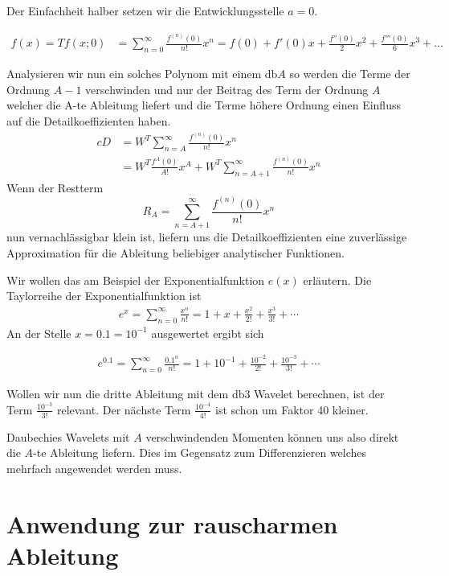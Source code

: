 \begin{refsection}
Der Einfachheit halber setzen wir die Entwicklungsstelle $a=0$.

\begin{align*}
    f(x) = T f(x; 0) & = \sum_{n=0}^\infty  \frac{f^{(n)}(0)}{n!} x^n = f(0) + f'(0) x + \frac{f''(0)}{2}x^2 + \frac{f'''(0)}{6} x^3 + \ldots
\end{align*}

Analysieren wir nun ein solches Polynom mit einem db$A$ so werden die Terme der
Ordnung $A-1$ verschwinden und nur der Beitrag des Term der Ordnung $A$ welcher
die A-te Ableitung liefert und die Terme höhere Ordnung einen Einfluss auf die
Detailkoeffizienten haben.
\begin{align*}
    cD &= W^T\sum_{n=A}^\infty \frac{f^{(n)}(0)}{n!} x^n \\
       &= W^T \frac{f^{A}(0)}{A!}x^A + W^T\sum_{n=A+1}^\infty \frac{f^{(n)}(0)}{n!} x^n
\end{align*}
Wenn der Restterm \[R_A = \sum_{n=A+1}^\infty \frac{f^{(n)}(0)}{n!} x^n\] nun
vernachlässigbar klein ist, liefern uns die Detailkoeffizienten eine
zuverlässige Approximation für die Ableitung beliebiger analytischer
Funktionen.

Wir wollen das am Beispiel der Exponentialfunktion $e(x)$ erläutern. Die Taylorreihe der Exponentialfunktion ist
\begin{align*}
    e^{x} = \sum^{\infty}_{n=0} \frac{x^n}{n!} = 1 + x + \frac{x^2}{2!} + \frac{x^3}{3!} + \cdots
\end{align*}
An der Stelle $x=0.1=10^{-1}$ ausgewertet ergibt sich

\begin{align*}
    e^{0.1} = \sum^{\infty}_{n=0} \frac{0.1^n}{n!} = 1 + 10^{-1} + \frac{10^{-2}}{2!} + \frac{10^{-3}}{3!} + \cdots
\end{align*}

Wollen wir nun die dritte Ableitung mit dem db3 Wavelet berechnen, ist der Term
$\frac{10^{-3}}{3!}$ relevant. Der nächste Term $\frac{10^{-4}}{4!}$ ist schon
um Faktor 40 kleiner.

Daubechies Wavelets mit $A$ verschwindenden Momenten
können uns also direkt die $A$-te Ableitung liefern. Dies im Gegensatz zum
Differenzieren welches mehrfach angewendet werden muss.

\section{Anwendung zur rauscharmen Ableitung}


\end{refsection}
